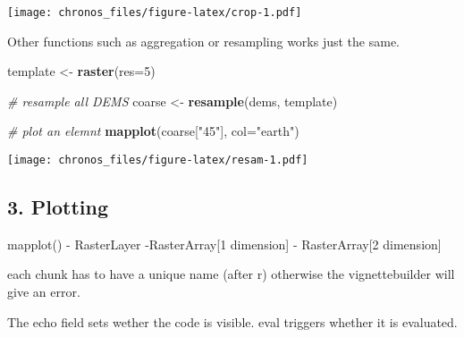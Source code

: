 \documentclass[]{article}
\newenvironment{Shaded}{\begin{snugshade}}{\end{snugshade}}
\newcommand{\CommentTok}[1]{\textcolor[rgb]{0.56,0.35,0.01}{\textit{#1}}}
\newcommand{\DataTypeTok}[1]{\textcolor[rgb]{0.13,0.29,0.53}{#1}}
\newcommand{\DecValTok}[1]{\textcolor[rgb]{0.00,0.00,0.81}{#1}}
\newcommand{\KeywordTok}[1]{\textcolor[rgb]{0.13,0.29,0.53}{\textbf{#1}}}
\newcommand{\NormalTok}[1]{#1}
\newcommand{\StringTok}[1]{\textcolor[rgb]{0.31,0.60,0.02}{#1}}
\begin{document}
\texttt{[image: chronos\_files/figure-latex/crop-1.pdf]}

Other functions such as aggregation or resampling works just the same.

\begin{Shaded}
\begin{Highlighting}[]
\NormalTok{template <-}\StringTok{ }\KeywordTok{raster}\NormalTok{(}\DataTypeTok{res=}\DecValTok{5}\NormalTok{)}

\CommentTok{# resample all DEMS}
\NormalTok{coarse <-}\StringTok{ }\KeywordTok{resample}\NormalTok{(dems, template)}

\CommentTok{# plot an elemnt}
\KeywordTok{mapplot}\NormalTok{(coarse[}\StringTok{"45"}\NormalTok{], }\DataTypeTok{col=}\StringTok{"earth"}\NormalTok{)}
\end{Highlighting}
\end{Shaded}

\texttt{[image: chronos\_files/figure-latex/resam-1.pdf]}

\hypertarget{plotting}{%
\subsection{3. Plotting}\label{plotting}}

mapplot() - RasterLayer -RasterArray{[}1 dimension{]} - RasterArray{[}2
dimension{]}

each chunk has to have a unique name (after r) otherwise the
vignettebuilder will give an error.

The echo field sets wether the code is visible. eval triggers whether it
is evaluated.
\end{document}
